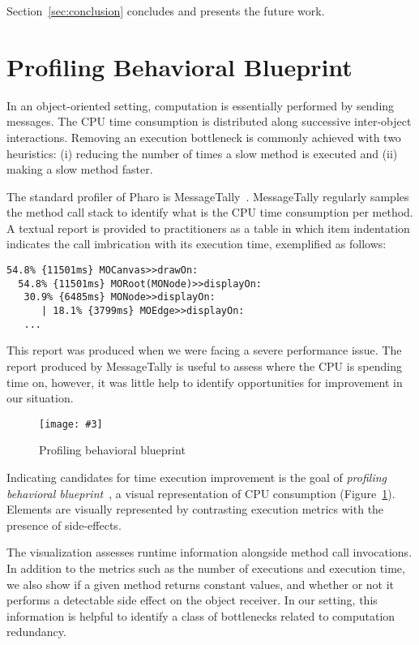 \documentclass[runningheads]{llncs}
\newcommand{\sd}[1]{\nb{SD}{orange}{#1}}
\newcommand{\fig}[4]{
	\begin{figure}[#1]
		\centering
		\texttt{[image: \#3]}
		\caption{\label{fig:#3}#4}
	\end{figure}}
\newcommand{\seclabel}[1]{\label{sec:#1}}
\newcommand{\figref}[1]{Figure~\ref{fig:#1}}
\newcommand{\secref}[1]{Section~\ref{sec:#1}}
\newcommand{\myparagraph}[1]{\noindent \textbf{#1.}}
\begin{document}
\secref{conclusion} concludes and presents the future work.



\section{Profiling Behavioral Blueprint}\seclabel{profilingblueprint}

In an object-oriented setting, computation is essentially performed by sending messages. The CPU time consumption is distributed along successive inter-object interactions. Removing an execution bottleneck is commonly achieved with two heuristics: (i) reducing the number of times a slow method is executed and (ii) making a slow method faster.

The standard profiler of Pharo is MessageTally~\cite{Berg11d}. MessageTally regularly samples the method call stack to identify what is the CPU time consumption per method. A textual report is provided to practitioners as a table in which item indentation indicates the call imbrication with its execution time, exemplified as follows: 

\begin{lstlisting}
54.8% {11501ms} MOCanvas>>drawOn: 
  54.8% {11501ms} MORoot(MONode)>>displayOn: 
   30.9% {6485ms} MONode>>displayOn: 
      | 18.1% {3799ms} MOEdge>>displayOn: 
   ...
\end{lstlisting}

This report was produced when we were facing a severe performance issue. The report produced by MessageTally is useful to assess where the CPU is spending time on, however, it was little help to identify opportunities for improvement in our situation. 

\fig{}{1.0}{ProfilingBlueprint}{Profiling behavioral blueprint}
Indicating candidates for time execution improvement is the goal of \emph{profiling behavioral blueprint}~\cite{Berg10c}, a visual representation of CPU consumption (\figref{ProfilingBlueprint}). Elements are visually represented by contrasting execution metrics with the presence of side-effects.
\sd{put a ref to polymetric views.}

The visualization assesses runtime information alongside method call invocations. In addition to the metrics such as the number of executions and execution time, we also show if a given method returns constant values, and whether or not it performs a detectable side effect on the object receiver. In our setting, this information is helpful to identify a class of bottlenecks related to computation redundancy.
\end{document}
